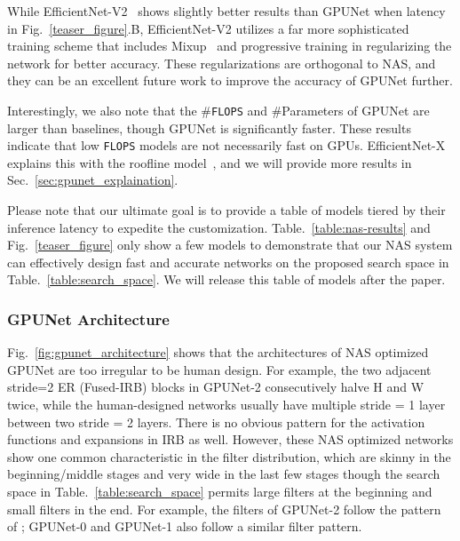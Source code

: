 \documentclass[10pt,twocolumn,letterpaper]{article}
\begin{document}
While EfficientNet-V2~\cite{tan2021efficientnetv2} shows slightly better results than GPUNet when latency  in Fig.~\ref{teaser_figure}.B, EfficientNet-V2 utilizes a far more sophisticated training scheme that includes Mixup~\cite{zhang2017mixup} and progressive training in regularizing the network for better accuracy. These regularizations are orthogonal to NAS, and they can be an excellent future work to improve the accuracy of GPUNet further. 

Interestingly, we also note that the \#{\tt FLOPS} and \#Parameters of GPUNet are larger than baselines, though GPUNet is significantly faster. These results indicate that low {\tt FLOPS} models are not necessarily fast on GPUs. EfficientNet-X explains this with the roofline model~\cite{li2021searching}, and we will provide more results in Sec.~\ref{sec:gpunet_explaination}.

Please note that our ultimate goal is to provide a table of models tiered by their inference latency to expedite the customization. Table.~\ref{table:nas-results} and Fig.~\ref{teaser_figure} only show a few models to demonstrate that our NAS system can effectively design fast and accurate networks on the proposed search space in Table.~\ref{table:search_space}. We will release this table of models after the paper.

\subsubsection{GPUNet Architecture}
\label{sec:fig:gpunet_architecture}
Fig.~\ref{fig:gpunet_architecture} shows that the architectures of NAS optimized GPUNet are too irregular to be human design. For example, the two adjacent stride=2 ER (Fused-IRB) blocks in GPUNet-2 consecutively halve H and W twice, while the human-designed networks usually have multiple stride = 1 layer between two stride = 2 layers. There is no obvious pattern for the activation functions and expansions in IRB as well. However, these NAS optimized networks show one common characteristic in the filter distribution, which are skinny in the beginning/middle stages and very wide in the last few stages though the search space in Table.~\ref{table:search_space} permits large filters at the beginning and small filters in the end. For example, the filters of GPUNet-2 follow the pattern of ; GPUNet-0 and GPUNet-1 also follow a similar filter pattern.
\end{document}
